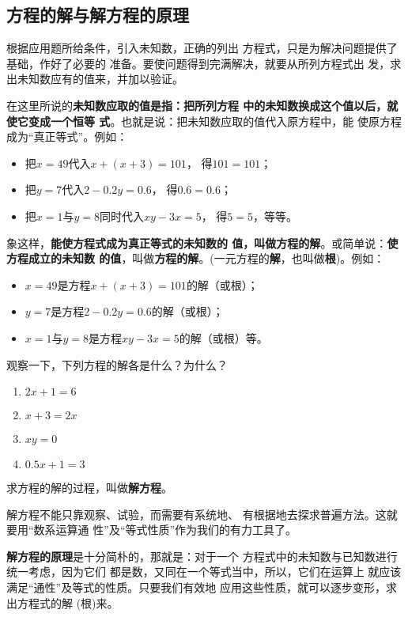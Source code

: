 \subsection{方程的解与解方程的原理}
    根据应用题所给条件，引入未知数，正确的列出
方程式，只是为解决问题提供了基础，作好了必要的
准备。要使问题得到完满解决，就要从所列方程式出
发，求出未知数应有的值来，并加以验证。

    在这里所说的\textbf{未知数应取的值是指：把所列方程
中的未知数换成这个值以后，就使它变成一个恒等
式}。也就是说：把未知数应取的值代入原方程中，能
使原方程成为“真正等式”。例如：
\begin{itemize}
    \item 把$x = 49$代入$x+ (x+3)=101$，    得$101=101$；
    \item 把$y=7$代入$2-0.2y=0.6$，    得$0 .6=0. 6$；
    \item 把$x=1$与$y=8$同时代入$xy-3x=5$，    得$5=5$，等等。
\end{itemize}
  
象这样，\textbf{能使方程式成为真正等式的未知数的
值，叫做方程的解}。或简单说：\textbf{使方程成立的未知数
的值}，叫做\textbf{方程的解}。(一元方程的\textbf{解}，也叫做\textbf{根})。例如：
\begin{itemize}
    \item $x = 49$是方程$x+ (x+3)=101$的解（或根）；
    \item $y=7$是方程$2-0.2y=0.6$的解（或根）；
    \item $x=1$与$y=8$是方程$xy-3x=5$的解（或根）等。
\end{itemize}


\begin{ex}
    观察一下，下列方程的解各是什么？为什么？
    \begin{multicols}{2}
        \begin{enumerate}
 \item $2x+1=6$
 \item $x+3=2x$
 \item $xy=0$
 \item $0.5x+1=3$           
        \end{enumerate}
    \end{multicols}
\end{ex}

求方程的解的过程，叫做\textbf{解方程}。

解方程不能只靠观察、试验，而需要有系统地、
有根据地去探求普遍方法。这就要用“数系运算通
性”及“等式性质”作为我们的有力工具了。

\textbf{解方程的原理}是十分简朴的，那就是：对于一个
方程式中的未知数与已知数进行统一考虑，因为它们
都是数，又同在一个等式当中，所以，它们在运算上
就应该满足“通性”及等式的性质。只要我们有效地
应用这些性质，就可以逐步变形，求出方程式的解
(根)来。

